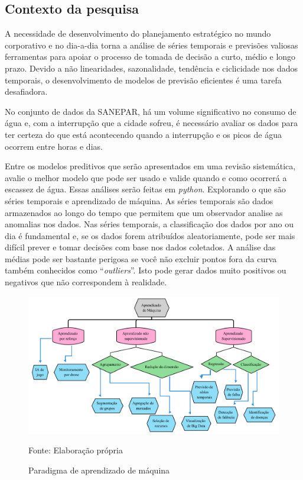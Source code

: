 \subsection{Contexto da pesquisa} \label{subsec:contexto}
 A necessidade de desenvolvimento do planejamento estratégico no mundo corporativo e no dia-a-dia torna a análise de séries temporais e previsões valiosas ferramentas para apoiar o processo de tomada de decisão a curto, médio e longo prazo. Devido a não linearidades, sazonalidade, tendência e ciclicidade nos dados temporais, o desenvolvimento de modelos de previsão eficientes é uma tarefa desafiadora. 

No conjunto de dados da SANEPAR, há um volume significativo no consumo de água e, com a interrupção que a cidade sofreu, é necessário avaliar os dados para ter certeza do que está acontecendo quando a interrupção e os picos de água ocorrem entre horas e dias.

Entre os modelos preditivos que serão apresentados em uma revisão sistemática, avalie o melhor modelo que pode ser usado e valide quando e como ocorrerá a escassez de água. Essas análises serão feitas em \textit{python}.
Explorando o que são séries temporais e aprendizado de máquina. As séries temporais são dados armazenados ao longo do tempo que permitem que um observador analise as anomalias nos dados. Nas séries temporais, a classificação dos dados por ano ou dia é fundamental e, se os dados forem atribuídos aleatoriamente, pode ser mais difícil prever e tomar decisões com base nos dados coletados. 
A análise das médias pode ser bastante perigosa se você não excluir pontos fora da curva também conhecidos como ``\textit{outliers}''. Isto pode gerar dados muito positivos ou negativos que não correspondem à realidade.
 
 
\begin{figure}[H]
	\centering
	\caption{Paradigma de aprendizado de máquina}
	\includegraphics[width=1\linewidth]{Introducao/Figuras/paradigma-ml}
	
	Fonte: Elaboração própria
	\label{fig:paradigma-ml}
\end{figure}
  
